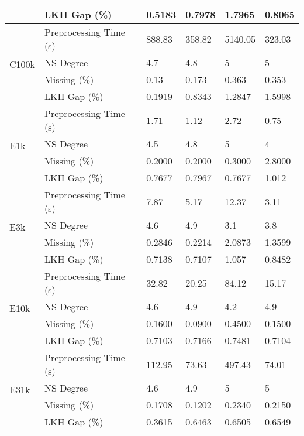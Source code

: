 \begin{longtable}[c]{llllll}
                & LKH Gap (\%)           & 0.5183 & 0.7978 & 1.7965  & 0.8065 \\
    \midrule
    \multirow{4}[2]{*}{C100k}  & Preprocessing Time (s) & 888.83 & 358.82 & 5140.05 & 323.03 \\
                & NS Degree       & 4.7    & 4.8    & 5       & 5      \\
                & Missing (\%)               & 0.13  & 0.173 & 0.363 & 0.353 \\
                & LKH Gap (\%)           & 0.1919 & 0.8343 & 1.2847  & 1.5998 \\
    \midrule
    \multirow{4}[2]{*}{E1k}    & Preprocessing Time (s) & 1.71   & 1.12   & 2.72    & 0.75   \\
                & NS Degree       & 4.5    & 4.8    & 5       & 4      \\
                & Missing (\%)               & 0.2000  & 0.2000  & 0.3000  & 2.8000  \\
                & LKH Gap (\%)           & 0.7677 & 0.7967 & 0.7677  & 1.012  \\
    \midrule
    \multirow{4}[2]{*}{E3k}    & Preprocessing Time (s) & 7.87   & 5.17   & 12.37   & 3.11   \\
                & NS Degree       & 4.6    & 4.9    & 3.1     & 3.8    \\
                & Missing (\%)               & 0.2846  & 0.2214  & 2.0873  & 1.3599  \\
                & LKH Gap (\%)           & 0.7138 & 0.7107 & 1.057   & 0.8482 \\
    \midrule
    \multirow{4}[2]{*}{E10k}   & Preprocessing Time (s) & 32.82  & 20.25  & 84.12   & 15.17  \\
                & NS Degree       & 4.6    & 4.9    & 4.2     & 4.9    \\
                & Missing (\%)               & 0.1600  & 0.0900  & 0.4500  & 0.1500  \\
                & LKH Gap (\%)           & 0.7103 & 0.7166 & 0.7481  & 0.7104 \\
    \midrule
    \multirow{4}[2]{*}{E31k}   & Preprocessing Time (s) & 112.95 & 73.63  & 497.43  & 74.01  \\
                & NS Degree       & 4.6    & 4.9    & 5       & 5      \\
                & Missing (\%)              & 0.1708  & 0.1202  & 0.2340  & 0.2150  \\
                & LKH Gap (\%)           & 0.3615 & 0.6463 & 0.6505  & 0.6549 \\

\end{longtable}
